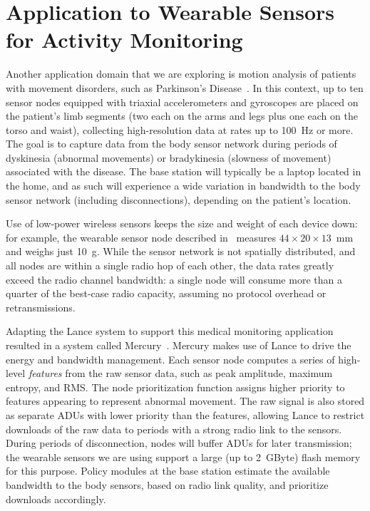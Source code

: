 \section{Application to Wearable Sensors for Activity Monitoring}
\label{lance-sec-mercury}

Another application domain that we are exploring is motion analysis of
patients with movement disorders, such as Parkinson's
Disease~\cite{parkinsons-embs07}. In this context, up to ten sensor nodes
equipped with triaxial accelerometers and gyroscopes are placed on the
patient's limb segments (two each on the arms and legs plus one each on the
torso and waist), collecting high-resolution data at rates up to 100~Hz or
more. The goal is to capture data from the body sensor network during periods
of dyskinesia (abnormal movements) or bradykinesia (slowness of movement)
associated with the disease. The base station will typically be a laptop
located in the home, and as such will experience a wide variation in
bandwidth to the body sensor network (including disconnections), depending on
the patient's location.

Use of low-power wireless sensors keeps the size and weight of each device
down: for example, the wearable sensor node described
in~\cite{parkinsons-embs07} measures $44 \times 20 \times 13$~mm and weighs
just 10~g. While the sensor network is not spatially distributed, and all
nodes are within a single radio hop of each other, the data rates greatly
exceed the radio channel bandwidth: a single node will consume more than a
quarter of the best-case radio capacity, assuming no protocol overhead or
retransmissions.

Adapting the Lance system to support this medical monitoring application
resulted in a system called Mercury~\cite{mercury-sensys09}. Mercury makes
use of Lance to drive the energy and bandwidth management. Each sensor node
computes a series of high-level \textit{features} from the raw sensor data,
such as peak amplitude, maximum entropy, and RMS. The node prioritization
function assigns higher priority to features appearing to represent abnormal
movement. The raw signal is also stored as separate ADUs with lower priority
than the features, allowing Lance to restrict downloads of the raw data to
periods with a strong radio link to the sensors. During periods of
disconnection, nodes will buffer ADUs for later transmission; the wearable
sensors we are using support a large (up to 2~GByte) flash memory for this
purpose. Policy modules at the base station estimate the available bandwidth
to the body sensors, based on radio link quality, and prioritize downloads
accordingly.


